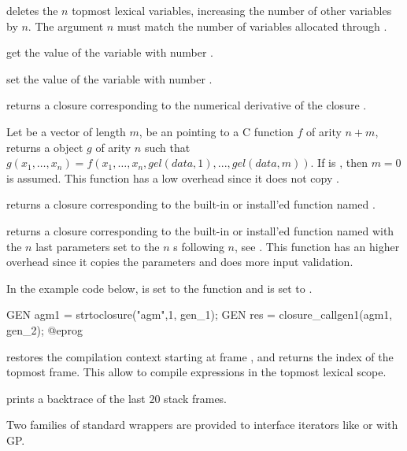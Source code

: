  deletes the $n$ topmost lexical variables,
increasing the number of other variables by $n$. The argument $n$ must
match the number of variables allocated through .

 get the value of the variable with number .

 set the value of the variable with number
.


 returns a closure corresponding to the
numerical derivative of the closure .

Let  be a vector of length $m$,  be an  pointing
to a C function $f$ of arity $n+m$, returns a  object $g$ of arity
$n$ such that $g(x_1,\ldots,x_n)=f(x_1,\ldots,x_n,gel(data,1),...,gel(data,m))$.
If  is , then $m=0$ is assumed.  This function has a low
overhead since it does not copy .

 returns a closure corresponding to the
built-in or install'ed function named .

 returns a closure corresponding to the
built-in or install'ed function named  with the $n$ last parameters set to
the $n$ s following $n$, see . This function
has an higher overhead since it copies the parameters and does more input validation.

In the example code below,  is set to the function  and
 is set to .

\bprog
  GEN agm1 = strtoclosure("agm",1, gen_1);
  GEN res = closure_callgen1(agm1, gen_2);
@eprog

 restores the compilation context
starting at frame , and returns the index of the topmost frame.
This allow to compile expressions in the topmost lexical scope.

 prints a backtrace of the last $20$ stack frames.

Two families of standard wrappers are provided to interface iterators like 
or  with GP.

